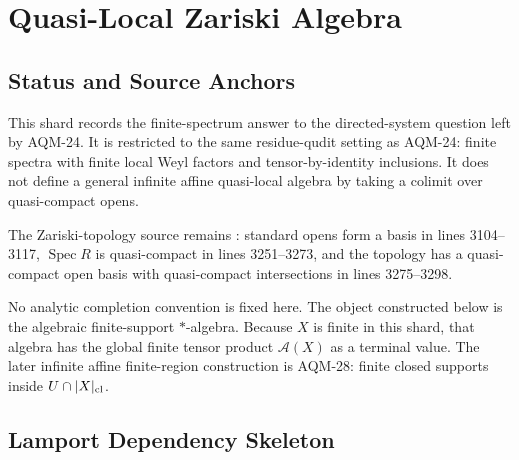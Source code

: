 
\section{Quasi-Local Zariski Algebra}
\label{sec:quasilocal-zariski-algebra}

\subsection{Status and Source Anchors}

This shard records the finite-spectrum answer to the directed-system question
left by AQM-24.  It is restricted to the same residue-qudit setting as AQM-24:
finite spectra with finite local Weyl factors and tensor-by-identity
inclusions.  It does not define a general infinite affine quasi-local algebra
by taking a colimit over quasi-compact opens.

The Zariski-topology source remains
: standard
opens form a basis in lines 3104--3117, \(\operatorname{Spec}R\) is
quasi-compact in lines 3251--3273, and the topology has a quasi-compact open
basis with quasi-compact intersections in lines 3275--3298.

No analytic completion convention is fixed here.  The object constructed below
is the algebraic finite-support \(*\)-algebra.  Because \(X\) is finite in
this shard, that algebra has the global finite tensor product \(\mathcal A(X)\)
as a terminal value.  The later infinite affine finite-region construction is
AQM-28: finite closed supports inside \(U\cap |X|_{\rm cl}\).

\subsection{Lamport Dependency Skeleton}

